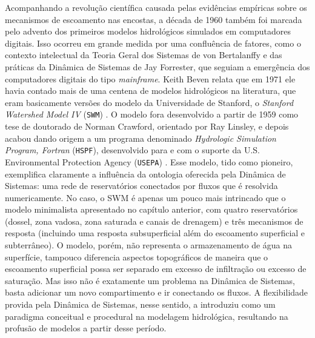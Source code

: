 \documentclass[./main.tex]{subfiles}
\begin{document}
\par Acompanhando a revolução científica causada pelas evidências empíricas sobre os mecanismos de escoamento nas encostas, a década de 1960 também foi marcada pelo advento dos primeiros modelos hidrológicos simulados em computadores digitais. Isso ocorreu em grande medida por uma confluência de fatores, como o contexto intelectual da Teoria Geral dos Sistemas de von Bertalanffy e das práticas da Dinâmica de Sistemas de Jay Forrester, que seguiam a emergência dos computadores digitais do tipo \textit{mainframe}. Keith Beven relata que em 1971 ele havia contado mais de uma centena de modelos hidrológicos na literatura, que eram basicamente versões do modelo da Universidade de Stanford, o \textit{Stanford Watershed Model IV} (\texttt{SWM}) \cite{Beven2019a}. O modelo fora desenvolvido a partir de 1959 como tese de doutorado de Norman Crawford, orientado por Ray Linsley, e depois acabou dando origem a um programa denominado \textit{Hydrologic Simulation Program, Fortran} (\texttt{HSPF}), desenvolvido para e com o suporte da U.S. Environmental Protection Agency (\texttt{USEPA}) \cite{Burges2004a}. Esse modelo, tido como pioneiro, exemplifica claramente a influência da ontologia oferecida pela Dinâmica de Sistemas: uma rede de reservatórios conectados por fluxos que é resolvida numericamente. No caso, o SWM é apenas um pouco mais intrincado que o modelo minimalista apresentado no capítulo anterior, com quatro reservatórios (dossel, zona vadosa, zona saturada e canais de drenagem) e três mecanismos de resposta (incluindo uma resposta subsuperficial além do escoamento superficial e subterrâneo). O modelo, porém, não representa o armazenamento de água na superfície, tampouco diferencia aspectos topográficos de maneira que o escoamento superficial possa ser separado em excesso de infiltração ou excesso de saturação. Mas isso não é exatamente um problema na Dinâmica de Sistemas, basta adicionar um novo compartimento e ir conectando os fluxos. A flexibilidade provida pela Dinâmica de Sistemas, nesse sentido, a introduziu como um \gls{paradigma} conceitual e procedural na modelagem hidrológica, resultando na profusão de modelos a partir desse período. 
\end{document}
